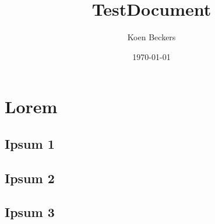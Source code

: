 \documentclass[a4paper,10pt]{report}
\title{TestDocument}
\author{Koen Beckers}
\date{\today}
\institute{Hogeschool van Arnhem en Nijmegen}
\begin{document}
 
\maketitle
\setcounter{footnote}{0}
\tableofcontents
\newpage
\chapter{Lorem} 
\section{Ipsum 1}
\lipsum[1-60] %
\section{Ipsum 2}
\lipsum[1-60] %
\section{Ipsum 3}
\lipsum[1-60] %
\end{document}
